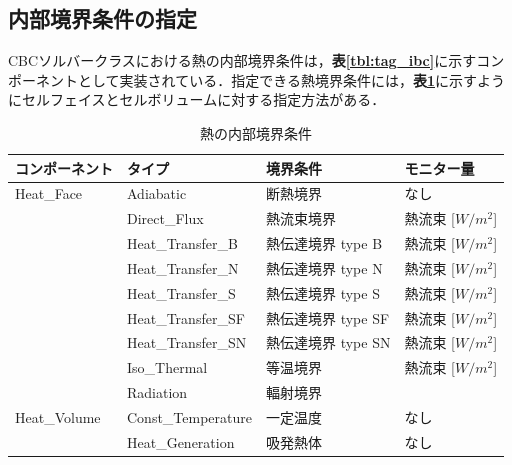 %
\subsection{内部境界条件の指定}
\label{sec:heat_int_bc}
CBCソルバークラスにおける熱の内部境界条件は，\textbf{表\ref{tbl:tag_ibc}}に示すコンポーネントとして実装されている．指定できる熱境界条件には，\textbf{表\ref{tbl:inner_tbc}}に示すようにセルフェイスとセルボリュームに対する指定方法がある．

\begin{table}[htdp]
\caption{熱の内部境界条件}
\begin{center}
\small
\begin{tabular}{l|lll} \toprule
コンポーネント & タイプ & 境界条件 & モニター量\\ \midrule
Heat\_Face & Adiabatic & 断熱境界 & なし\\
 & Direct\_Flux & 熱流束境界 & 熱流束 [$W/m^2$]\\
 & Heat\_Transfer\_B & 熱伝達境界 type B & 熱流束 [$W/m^2$]\\
 & Heat\_Transfer\_N & 熱伝達境界 type N & 熱流束 [$W/m^2$]\\ 
 & Heat\_Transfer\_S & 熱伝達境界 type S & 熱流束 [$W/m^2$]\\ 
 & Heat\_Transfer\_SF & 熱伝達境界 type SF & 熱流束 [$W/m^2$]\\ 
 & Heat\_Transfer\_SN & 熱伝達境界 type SN & 熱流束 [$W/m^2$]\\ 
 & Iso\_Thermal & 等温境界 & 熱流束 [$W/m^2$]\\ 
 & Radiation & 輻射境界\footnotemark[1] & \\ \hline
Heat\_Volume & Const\_Temperature & 一定温度 & なし\\
 & Heat\_Generation & 吸発熱体 & なし\\ \bottomrule
\end{tabular}
\end{center}
\label{tbl:inner_tbc}
\end{table}


